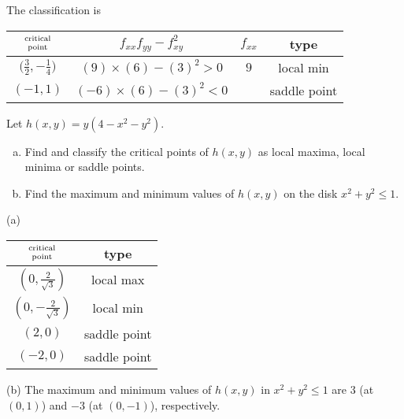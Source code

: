 \begin{solution}
The classification is
\begin{center}
\renewcommand{\arraystretch}{1.3}
     \begin{tabular}{|c|c|c|c|}
     \hline
    $\Atop{\text{critical}}{\text{point}}$  & $f_{xx}f_{yy}-f_{xy}^2$ & 
                                                          $f_{xx}$ & type \\    
    \hline
     $\big(\frac{3}{2},-\frac{1}{4}\big)$  & $(9)\times (6)-(3)^2> 0$ &  $9$  & local min  \\ \hline
     $(-1,1)$  & $(-6)\times (6)-(3)^2<0$ &  & saddle point \\  \hline
     \end{tabular}
\renewcommand{\arraystretch}{1.0}
\end{center}
 \end{solution}

\begin{question}[M200 2011A] %
Let $h(x, y) = y(4 - x^2 - y^2)$.
\begin{enumerate}[(a)]
\item
Find and classify the critical points of $h(x, y)$ as local maxima, local minima or 
saddle points.
\item
Find the maximum and minimum values of $h(x, y)$ on the disk $x^2 + y^2 \le 1$.
\end{enumerate}
\end{question}

%

\begin{answer}
(a)
\begin{center}
\renewcommand{\arraystretch}{1.3}
     \begin{tabular}{|c|c|}
     \hline
    $\Atop{\text{critical}}{\text{point}}$   & type \\    
    \hline
     $\left(0,\frac{2}{\sqrt{3}}\right)$  
            & local max  \\ \hline
     $\left(0,-\frac{2}{\sqrt{3}}\right)$  
            & local min \\  \hline
     $(2,0)$   & saddle point \\  \hline
     $(-2,0)$  & saddle point \\  \hline
     \end{tabular}
\renewcommand{\arraystretch}{1.0}
\end{center}

(b) The maximum and minimum values of $h(x,y)$ in $x^2+y^2\le 1$
     are $3$ (at $(0,1)$) and  $-3$ (at $(0,-1)$), respectively.
\end{answer}

